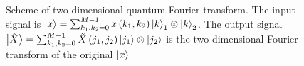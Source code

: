 \begin{figure}
\centering



\caption{Scheme of two-dimensional quantum Fourier transform. The input
  signal is $\ket{x} = \sum_{k_1,k_2=0}^{M-1} x\left(k_1,
  k_2\right)\ket{k}_1 \otimes \ket{k}_2$. The output signal $\ket{\tilde{X}} = \sum_{k_1,k_2=0}^{M-1} \tilde{X}\left(j_1,
  j_2\right) \ket{j_1} \otimes \ket{j_2}$ is the two-dimensional
  Fourier transform of 
  the original $\ket{x}$}
\label{figQuantCompQuantFourier2d}
\end{figure}
